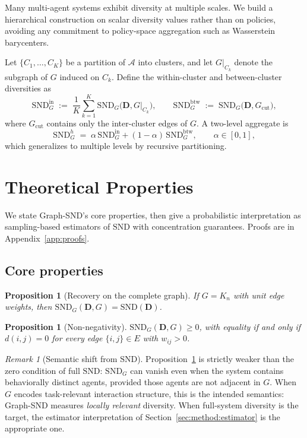 \documentclass[11pt]{article}
\theoremstyle{plain}
\newtheorem{proposition}[theorem]{Proposition}
\theoremstyle{definition}
\theoremstyle{remark}
\newtheorem{remark}[theorem]{Remark}
\newcommand{\Agents}{\mathcal{A}}        %
\newcommand{\SND}{\ensuremath{\mathrm{SND}}}
\newcommand{\SNDG}{\mathrm{SND}_{G}}
\begin{document}
Many multi-agent systems exhibit diversity at multiple scales. We build a
hierarchical construction on scalar diversity values rather than on
policies, avoiding any commitment to policy-space aggregation such as
Wasserstein barycenters.

Let $\{C_1, \dots, C_K\}$ be a partition of $\Agents$ into clusters, and
let $G|_{C_k}$ denote the subgraph of $G$ induced on $C_k$. Define the
within-cluster and between-cluster diversities as
\[
\SNDG^{\mathrm{in}} \;:=\; \frac{1}{K}\sum_{k=1}^K \SNDG\bigl(\mathbf{D}, G|_{C_k}\bigr),
\qquad
\SNDG^{\mathrm{btw}} \;:=\; \SNDG\bigl(\mathbf{D}, G_{\mathrm{cut}}\bigr),
\]
where $G_{\mathrm{cut}}$ contains only the inter-cluster edges of $G$. A
two-level aggregate is
\begin{equation}
\label{eq:hsnd}
\SNDG^h \;=\; \alpha\, \SNDG^{\mathrm{in}} + (1-\alpha)\, \SNDG^{\mathrm{btw}},
\qquad \alpha \in [0,1],
\end{equation}
which generalizes to multiple levels by recursive partitioning.

\section{Theoretical Properties}
\label{sec:theory}

We state Graph-SND's core properties, then give a probabilistic
interpretation as sampling-based estimators of $\SND$ with concentration
guarantees. Proofs are in Appendix~\ref{app:proofs}.

\subsection{Core properties}

\begin{proposition}[Recovery on the complete graph]
\label{prop:recovery}
If $G = K_n$ with unit edge weights, then
$\SNDG(\mathbf{D}, G) = \SND(\mathbf{D})$.
\end{proposition}

\begin{proposition}[Non-negativity]
\label{prop:nonneg}
$\SNDG(\mathbf{D}, G) \geq 0$, with equality if and only if $d(i,j) = 0$
for every edge $\{i,j\} \in E$ with $w_{ij} > 0$.
\end{proposition}

\begin{remark}[Semantic shift from $\SND$]
\label{rem:semantics}
Proposition~\ref{prop:nonneg} is strictly weaker than the zero condition
of full $\SND$: $\SNDG$ can vanish even when the system contains
behaviorally distinct agents, provided those agents are not adjacent in
$G$. When $G$ encodes task-relevant interaction structure, this is the
intended semantics: Graph-SND measures \emph{locally relevant}
diversity. When full-system diversity is the target, the estimator
interpretation of Section~\ref{sec:method:estimator} is the appropriate
one.
\end{remark}
\end{document}
